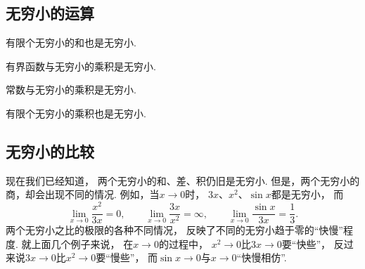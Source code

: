 \subsection{无穷小的运算}
\begin{theorem}
有限个无穷小的和也是无穷小.
\end{theorem}

\begin{theorem}
有界函数与无穷小的乘积是无穷小.
\end{theorem}

\begin{corollary}
常数与无穷小的乘积是无穷小.
\end{corollary}

\begin{corollary}
有限个无穷小的乘积也是无穷小.
\end{corollary}

\subsection{无穷小的比较}
现在我们已经知道，
两个无穷小的和、差、积仍旧是无穷小.
但是，两个无穷小的商，却会出现不同的情况.
例如，当\(x\to0\)时，
\(3x\)、\(x^2\)、\(\sin x\)都是无穷小，
而\[
	\lim_{x\to0}\frac{x^2}{3x}=0, \qquad
	\lim_{x\to0}\frac{3x}{x^2}=\infty, \qquad
	\lim_{x\to0}\frac{\sin x}{3x}=\frac{1}{3}.
\]
两个无穷小之比的极限的各种不同情况，
反映了不同的无穷小趋于零的“快慢”程度.
就上面几个例子来说，
在\(x\to0\)的过程中，
\(x^2\to0\)比\(3x\to0\)要“快些”，
反过来说\(3x\to0\)比\(x^2\to0\)要“慢些”，
而\(\sin x\to0\)与\(x\to0\)“快慢相仿”.

